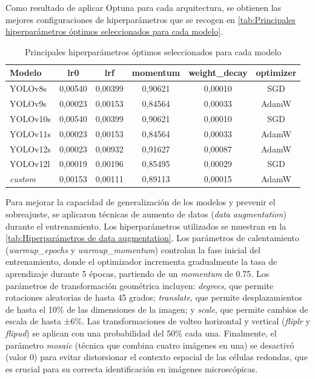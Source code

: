\documentclass[12pt,a4paper,onecolumn,oneside]{report}
\begin{document}
Como resultado de aplicar Optuna para cada arquitectura, se obtienen las mejores configuraciones de hiperparámetros que se recogen en \autoref{tab:Principales hiperparámetros óptimos seleccionados para cada modelo}.

\begin{table}[H]
\caption{Principales hiperparámetros óptimos seleccionados para cada modelo}
\label{tab:Principales hiperparámetros óptimos seleccionados para cada modelo}
\centering
\begin{tabular}{lccccc}
\toprule
\textbf{Modelo} & \textbf{lr0} & \textbf{lrf} & \textbf{momentum} & \textbf{weight\_decay} & \textbf{optimizer} \\
\midrule
YOLOv8s   & 0,00540 & 0,00399 & 0,90621 & 0,00010 & SGD \\
YOLOv9s   & 0,00023 & 0,00153 & 0,84564 & 0,00033 & AdamW \\
YOLOv10s  & 0,00540 & 0,00399 & 0,90621 & 0,00010 & SGD \\
YOLOv11s  & 0,00023 & 0,00153 & 0,84564 & 0,00033 & AdamW \\
YOLOv12s  & 0,00023 & 0,00932 & 0,91627 & 0,00087 & AdamW \\
YOLOv12l  & 0,00019 & 0,00196 & 0,85495 & 0,00029 & SGD \\
\textit{custom}    & 0,00153 & 0,00111 & 0,89113 & 0,00015 & AdamW \\
\bottomrule
\end{tabular}
\end{table}

Para mejorar la capacidad de generalización de los modelos y prevenir el sobreajuste, se aplicaron técnicas de aumento de datos (\textit{data augmentation}) 
durante el entrenamiento. Los hiperparámetros utilizados se muestran en la \autoref{tab:Hiperparámetros de data augmentation}. Los parámetros de calentamiento 
(\textit{warmup\_epochs} y \textit{warmup\_momentum}) controlan la fase inicial del entrenamiento, donde el optimizador incrementa gradualmente la tasa de 
aprendizaje durante 5 épocas, partiendo de un \textit{momentum} de 0.75. Los parámetros de transformación geométrica incluyen: \textit{degrees}, que permite rotaciones 
aleatorias de hasta 45 grados; \textit{translate}, que permite desplazamientos de hasta el 10\% de las dimensiones de la imagen; y \textit{scale}, que permite 
cambios de escala de hasta ±6\%. Las transformaciones de volteo horizontal y vertical (\textit{fliplr} y \textit{flipud}) se aplican con una probabilidad del 50\% 
cada una. Finalmente, el parámetro \textit{mosaic} (técnica que combina cuatro imágenes en una) se desactivó (valor 0) para evitar distorsionar el contexto 
espacial de las células redondas, que es crucial para su correcta identificación en imágenes microscópicas.
\end{document}

